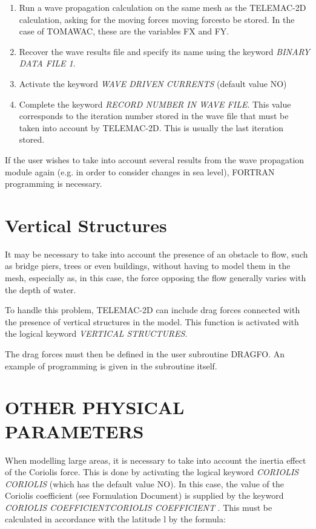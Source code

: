 \begin{enumerate}
\item  Run a wave propagation calculation on the same mesh as the TELEMAC-2D calculation, asking for the moving forces moving forcesto be stored. In the case of TOMAWAC, these are the variables FX and FY.

\item  Recover the wave results file and specify its name using the keyword \textit{BINARY DATA FILE 1}.

\item  Activate the keyword \textit{WAVE DRIVEN CURRENTS} (default value NO)

\item  Complete the keyword \textit{RECORD NUMBER IN WAVE FILE}. This value corresponds to the iteration number stored in the wave file that must be taken into account by TELEMAC-2D. This is usually the last iteration stored.
\end{enumerate}

 If the user wishes to take into account several results from the wave propagation module again (e.g. in order to consider changes in sea level), FORTRAN programming is necessary.


\section{ Vertical Structures }

 It may be necessary to take into account the presence of an obstacle to flow, such as bridge piers, trees or even buildings, without having to model them in the mesh, especially as, in this case, the force opposing the flow generally varies with the depth of water.

 To handle this problem, TELEMAC-2D can include drag forces connected with the presence of vertical structures in the model. This function is activated with the logical keyword \textit{VERTICAL STRUCTURES}.

 The drag forces must then be defined in the user subroutine DRAGFO. An example of programming is given in the subroutine itself.


\section{ OTHER PHYSICAL PARAMETERS}

 When modelling large areas, it is necessary to take into account the inertia effect of the Coriolis force. This is done by activating the logical keyword \textit{CORIOLIS} \textit{CORIOLIS}  (which has the default value NO). In this case, the value of the Coriolis coefficient (see Formulation Document) is supplied by the keyword \textit{CORIOLIS COEFFICIENTCORIOLIS COEFFICIENT }. This must be calculated in accordance with the latitude l by the formula:

